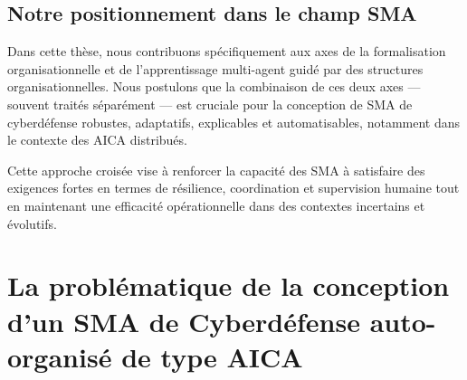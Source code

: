 \documentclass[ twoside,openright,titlepage,numbers=noenddot,headinclude,%
                footinclude=true,cleardoublepage=empty,abstractoff, %
                BCOR=5mm,paper=a4,fontsize=11pt,%
                french,american,%
                ]{scrreprt}
\begin{document}
\subsection*{Notre positionnement dans le champ SMA}

Dans cette thèse, nous contribuons spécifiquement aux axes de la formalisation organisationnelle et de l'apprentissage multi-agent guidé par des structures organisationnelles. Nous postulons que la combinaison de ces deux axes — souvent traités séparément — est cruciale pour la conception de SMA de cyberdéfense robustes, adaptatifs, explicables et automatisables, notamment dans le contexte des AICA distribués.

Cette approche croisée vise à renforcer la capacité des SMA à satisfaire des exigences fortes en termes de résilience, coordination et supervision humaine tout en maintenant une efficacité opérationnelle dans des contextes incertains et évolutifs.



\section{La problématique de la conception d'un SMA de Cyberdéfense auto-organisé de type AICA}\label{sec:problematique-sma-aica}
\end{document}
